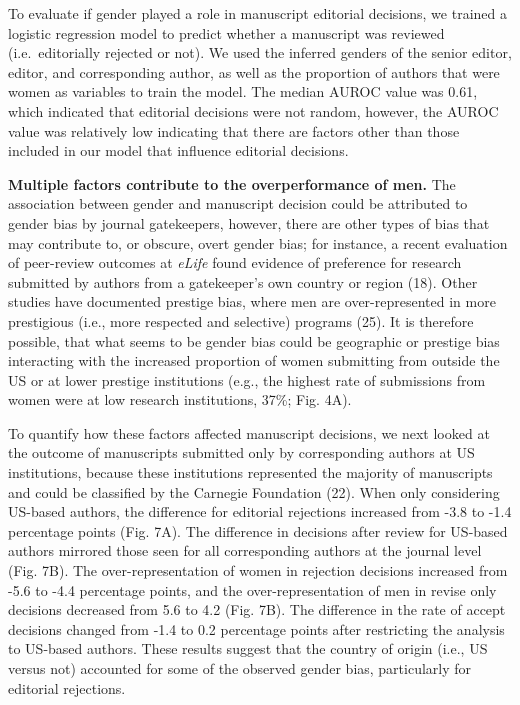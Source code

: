 \documentclass[11pt,]{article}
\begin{document}
To evaluate if gender played a role in manuscript editorial decisions,
we trained a logistic regression model to predict whether a manuscript
was reviewed (i.e.~editorially rejected or not). We used the inferred
genders of the senior editor, editor, and corresponding author, as well
as the proportion of authors that were women as variables to train the
model. The median AUROC value was 0.61, which indicated that editorial
decisions were not random, however, the AUROC value was relatively low
indicating that there are factors other than those included in our model
that influence editorial decisions.

\textbf{Multiple factors contribute to the overperformance of men.} The
association between gender and manuscript decision could be attributed
to gender bias by journal gatekeepers, however, there are other types of
bias that may contribute to, or obscure, overt gender bias; for
instance, a recent evaluation of peer-review outcomes at \emph{eLife}
found evidence of preference for research submitted by authors from a
gatekeeper's own country or region (18). Other studies have documented
prestige bias, where men are over-represented in more prestigious (i.e.,
more respected and selective) programs (25). It is therefore possible,
that what seems to be gender bias could be geographic or prestige bias
interacting with the increased proportion of women submitting from
outside the US or at lower prestige institutions (e.g., the highest rate
of submissions from women were at low research institutions, 37\%; Fig.
4A).

To quantify how these factors affected manuscript decisions, we next
looked at the outcome of manuscripts submitted only by corresponding
authors at US institutions, because these institutions represented the
majority of manuscripts and could be classified by the Carnegie
Foundation (22). When only considering US-based authors, the difference
for editorial rejections increased from -3.8 to -1.4 percentage points
(Fig. 7A). The difference in decisions after review for US-based authors
mirrored those seen for all corresponding authors at the journal level
(Fig. 7B). The over-representation of women in rejection decisions
increased from -5.6 to -4.4 percentage points, and the
over-representation of men in revise only decisions decreased from 5.6
to 4.2 (Fig. 7B). The difference in the rate of accept decisions changed
from -1.4 to 0.2 percentage points after restricting the analysis to
US-based authors. These results suggest that the country of origin
(i.e., US versus not) accounted for some of the observed gender bias,
particularly for editorial rejections.
\end{document}
